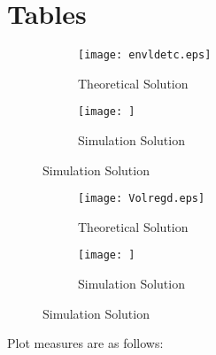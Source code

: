 \section{Tables}
\label{sec:tables}

\begin{figure}[H]
\centering
\caption{Plots from theoretical and simulation analysis}
\begin{subfigure}{\textwidth}
\centering
\texttt{[image: envldetc.eps]}
\caption{Theoretical Solution}
\end{subfigure}
\begin{subfigure}{\textwidth}
\centering
\texttt{[image: ]}
\caption{Simulation Solution}
\end{subfigure}
\end{figure}

\begin{figure}[H]
\centering
\caption{Solution - 12}
\begin{subfigure}{\textwidth}
\centering
\texttt{[image: Volregd.eps]}
\caption{Theoretical Solution}
\end{subfigure}
\begin{subfigure}{\textwidth}
\centering
\texttt{[image: ]}
\caption{Simulation Solution}
\end{subfigure}
\end{figure}

Plot measures are as follows:

